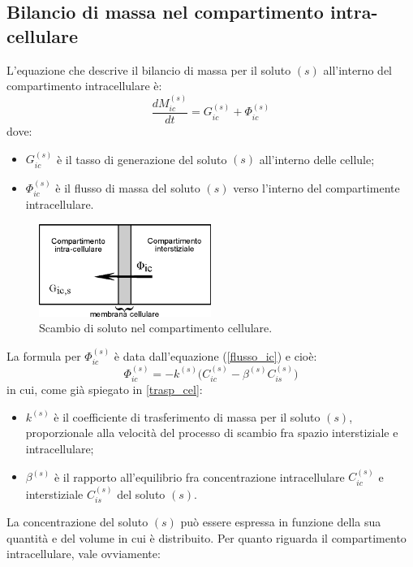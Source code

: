 \subsection{Bilancio di massa nel compartimento intra-cellulare}
L'equazione che descrive il bilancio di massa per il soluto $(s)$ all'interno del compartimento intracellulare è:
\begin{equation}
	\frac{dM_{ic}^{(s)}}{dt} = G_{ic}^{(s)}+ \Phi_{ic}^{(s)}
	\label{eq:dMic}
\end{equation}
dove:
\begin{itemize}
	\item $G_{ic}^{(s)}$ è il tasso di generazione del soluto $(s)$ all'interno delle cellule;
	\item $\Phi_{ic}^{(s)}$ è il flusso di massa del soluto $(s)$ verso l'interno del compartimente intracellulare.
\end{itemize}
\begin{figure}[htb]
	\centering
		\includegraphics[width=0.5\textwidth]{immagini/massa_ic.eps}
				\caption{Scambio di soluto nel compartimento cellulare.}
\end{figure}
La formula per $\Phi_{ic}^{(s)}$ è data dall'equazione (\ref{flusso_ic}) e cioè:
\begin{equation}
	\Phi_{ic}^{(s)} = - k^{(s)} \bigl(C_{ic}^{(s)} - \beta^{(s)} C_{is}^{(s)}\bigr)
	\label{eq:phi_ic}
\end{equation}
in cui, come già spiegato in \textsection\ref{trasp_cel}:
\begin{itemize}
	\item $k^{(s)}$ è il coefficiente di trasferimento di massa per il soluto $(s)$, proporzionale alla velocità del processo di scambio fra spazio interstiziale e intracellulare;
	\item $\beta^{(s)}$ è il rapporto all'equilibrio fra concentrazione intracellulare $C_{ic}^{(s)}$ e interstiziale $C_{is}^{(s)}$ del soluto $(s)$.
\end{itemize}
La concentrazione del soluto $(s)$ può essere espressa in funzione della sua quantità e del volume in cui è distribuito. Per quanto riguarda il compartimento intracellulare, vale ovviamente:
